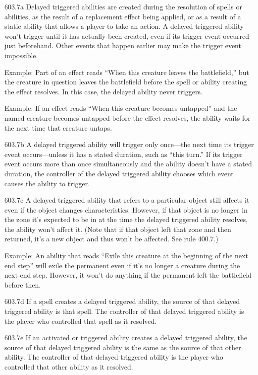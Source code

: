 603.7a Delayed triggered abilities are created during the resolution of spells or abilities, as the result of a replacement effect being applied, or as a result of a static ability that allows a player to take an action. A delayed triggered ability won’t trigger until it has actually been created, even if its trigger event occurred just beforehand. Other events that happen earlier may make the trigger event impossible.

Example: Part of an effect reads “When this creature leaves the battlefield,” but the creature in question leaves the battlefield before the spell or ability creating the effect resolves. In this case, the delayed ability never triggers.

Example: If an effect reads “When this creature becomes untapped” and the named creature becomes untapped before the effect resolves, the ability waits for the next time that creature untaps.

603.7b A delayed triggered ability will trigger only once—the next time its trigger event occurs—unless it has a stated duration, such as “this turn.” If its trigger event occurs more than once simultaneously and the ability doesn’t have a stated duration, the controller of the delayed triggered ability chooses which event causes the ability to trigger.

603.7c A delayed triggered ability that refers to a particular object still affects it even if the object changes characteristics. However, if that object is no longer in the zone it’s expected to be in at the time the delayed triggered ability resolves, the ability won’t affect it. (Note that if that object left that zone and then returned, it’s a new object and thus won’t be affected. See rule 400.7.)

Example: An ability that reads “Exile this creature at the beginning of the next end step” will exile the permanent even if it’s no longer a creature during the next end step. However, it won’t do anything if the permanent left the battlefield before then.

603.7d If a spell creates a delayed triggered ability, the source of that delayed triggered ability is that spell. The controller of that delayed triggered ability is the player who controlled that spell as it resolved.

603.7e If an activated or triggered ability creates a delayed triggered ability, the source of that delayed triggered ability is the same as the source of that other ability. The controller of that delayed triggered ability is the player who controlled that other ability as it resolved.


